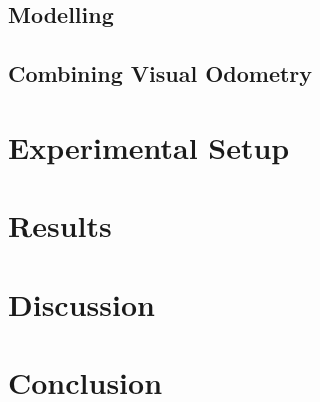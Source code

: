 \documentclass[a4paper]{article}
\begin{document}
\subsection{Modelling}


\subsection{Combining Visual Odometry}


\section{Experimental Setup}

\section{Results}

\section{Discussion}

\section{Conclusion}



\end{document}
